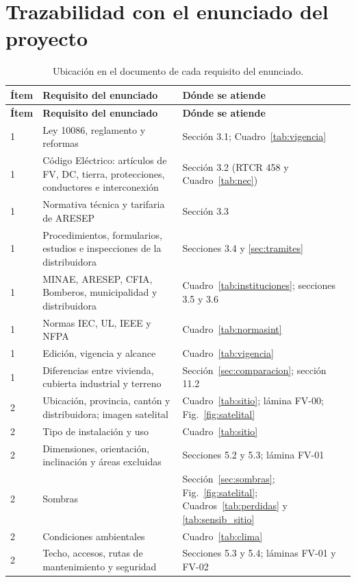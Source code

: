 \documentclass[12pt]{article}
\begin{document}
\section{Trazabilidad con el enunciado del proyecto}
\label{sec:trazabilidad}
{\small
\begin{longtable}{L{1.1cm}L{7.2cm}L{6.6cm}}
\caption{Ubicación en el documento de cada requisito del enunciado.}\label{tab:trazabilidad}\\
\toprule
\textbf{Ítem} & \textbf{Requisito del enunciado} & \textbf{Dónde se atiende}\\
\midrule\endfirsthead
\toprule
\textbf{Ítem} & \textbf{Requisito del enunciado} & \textbf{Dónde se atiende}\\
\midrule{} & Ley 10086, reglamento y reformas & Sección 3.1; Cuadro~\ref{tab:vigencia}\\
1 & Código Eléctrico: artículos de FV, DC, tierra, protecciones, conductores e interconexión & Sección 3.2 (RTCR 458 y Cuadro~\ref{tab:nec})\\
1 & Normativa técnica y tarifaria de ARESEP & Sección 3.3\\
1 & Procedimientos, formularios, estudios e inspecciones de la distribuidora & Secciones 3.4 y \ref{sec:tramites}\\
1 & MINAE, ARESEP, CFIA, Bomberos, municipalidad y distribuidora & Cuadro~\ref{tab:instituciones}; secciones 3.5 y 3.6\\
1 & Normas IEC, UL, IEEE y NFPA & Cuadro~\ref{tab:normasint}\\
1 & Edición, vigencia y alcance & Cuadro~\ref{tab:vigencia}\\
1 & Diferencias entre vivienda, cubierta industrial y terreno & Sección~\ref{sec:comparacion}; sección 11.2\\
2 & Ubicación, provincia, cantón y distribuidora; imagen satelital & Cuadro~\ref{tab:sitio}; lámina FV-00; Fig.~\ref{fig:satelital}\\
2 & Tipo de instalación y uso & Cuadro~\ref{tab:sitio}\\
2 & Dimensiones, orientación, inclinación y áreas excluidas & Secciones 5.2 y 5.3; lámina FV-01\\
2 & Sombras & Sección~\ref{sec:sombras}; Fig.~\ref{fig:satelital}; Cuadros~\ref{tab:perdidas} y \ref{tab:sensib_sitio}\\
2 & Condiciones ambientales & Cuadro~\ref{tab:clima}\\
2 & Techo, accesos, rutas de mantenimiento y seguridad & Secciones 5.3 y 5.4; láminas FV-01 y FV-02\\

\end{longtable}}
\end{document}

